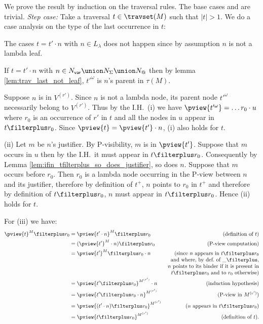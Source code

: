 We prove the result by induction on the traversal rules. The base cases  and
 are trivial. \emph{Step case:} Take a traversal $t
\in \travset(M)$ such that $|t|>1$. We do a case analysis on the type of the last occurrence in $t$:
    \begin{compactitem}
    \item The cases $t = t' \cdot n$ with $n\in L_\lambda$ does not happen since by assumption $n$ is not a
    lambda leaf.

    \item If $t = t' \cdot n$ with $n \in N_{\sf var} \union
    N_\Sigma \union N_@$ then by lemma
    \ref{lem:trav_last_not_leaf}, $t'^\omega$ is $n$'s
    parent in $\tau(M)$.

    Suppose $n$ is in $V^{(r')}$. Since $n$ is not a lambda
    node, its parent node $t'^\omega$ necessarily belong to
    $V^{(r')}$. Thus by the I.H.\ (i) we have
    $\pview{t'^\omega} = \ldots r_0 \cdot u$ where $r_0$ is
    an occurrence of $r'$ in $t$ and all the nodes in
    $u$ appear in $t\filterplus r_0$.
    Since $\pview{t} = \pview{t'} \cdot n$, (i) also holds for $t$.

    (ii) Let $m$ be $n$'s justifier. By P-visibility, $m$ is in $\pview{t'}$.
    Suppose that $m$ occurs in $u$ then by the I.H.\ it must appear in $t\filterplus r_0$. Consequently by Lemma \ref{lem:ifin_tfilterplus_so_does_justifier}, so does $n$.
    Suppose that $m$ occurs before $r_0$. Then $r_0$ is a lambda node occurring in the P-view between $n$ and its justifier, therefore
    by definition of $t^+$, $n$ points to $r_0$ in $t^+$ and therefore by definition of $t\filterplus  r_0$,
    $n$ must appear in $t\filterplus r_0$. Hence (ii) holds for $t$.

    For (iii) we have:
        \begin{align*}
        \pview{t}^M \filterplus r_0
    &= \pview{t' \cdot n}^M \filterplus r_0 & (\mbox{definition of } t)\\
            &= (\pview{t'}^M \cdot n) \filterplus r_0  & (\mbox{P-view computation}) \\
            &= \pview{t'}^M \filterplus r_0  \cdot n             & \parbox[t]{6cm}{(\raggedleft since $n$ appears in $t\filterplus r_0$ and where,
             by def.\ of $\_ \filterplus$,  $n$ points to its binder if it is present in $t\filterplus r_0$ and to
             $r_0$ otherwise)} \\
            &= \pview{t' \filterplus  r_0 }^{M^{(r')}} \cdot n            & (\mbox{induction hypothesis}) \\
            &= \pview{t' \filterplus  r_0 \cdot n }^{M^{(r')}} & (\mbox{P-view in $M^{(r')}$}) \\
            &= \pview{(t' \cdot n ) \filterplus  r_0  }^{M^{(r')}}           & (\mbox{$n$ appears in $t\filterplus r_0$}) \\
            &= \pview{t \filterplus  r_0  }^{M^{(r')}}
     & (\mbox{definition of } t).
        \end{align*}


\end{compactitem}
